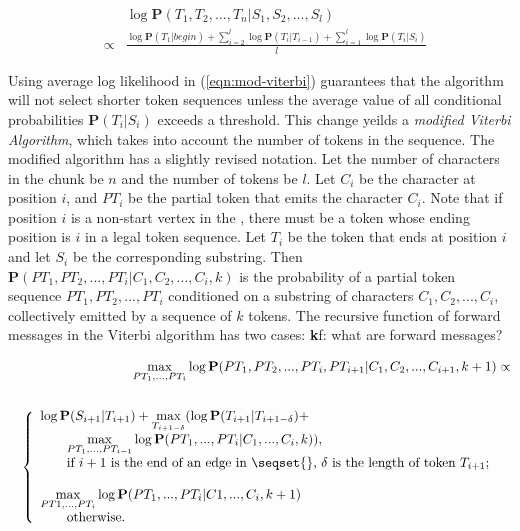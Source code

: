 \begin{eqnarray}
&& \log \mathbf{P}(T_1, T_2, ..., T_n|S_1, S_2, ..., S_l) \nonumber \\ 
& \propto & \frac{\log \mathbf{P}(T_1|begin) +
\sum_{i=2}^{l}\log \mathbf{P}(T_i|T_{i-1}) + 
\sum_{i=1}^{l}\log \mathbf{P}(T_i|S_i)}{l}\label{eqn:mod-viterbi}
\end{eqnarray}

Using average log likelihood in (\ref{eqn:mod-viterbi}) 
guarantees that the algorithm will not select shorter token sequences
unless the average value of all conditional
probabilities $\mathbf{P}(T_i|S_i)$ exceeds a threshold.
This change yeilds a {\em modified Viterbi Algorithm},
which takes into account the number of tokens in the sequence.
The modified algorithm has a slightly revised notation.
Let the number of characters in the chunk be $n$ and the number of tokens be $l$. 
Let $C_i$ be the character at position $i$, and 
$PT_i$ be the partial token that emits the character $C_i$. 
Note that if position $i$ is a non-start vertex in the \seqset{}, 
there must be a token whose ending position is
$i$ in a legal token sequence. Let $T_i$ be the token
that ends at position $i$ and let $S_i$ be the corresponding substring. 
Then
$\mathbf{P}(PT_1, PT_2, ..., PT_i|C_1, C_2, ..., C_i, k)$ is the
probability of a partial token sequence $PT_1, PT_2, ..., PT_i$
conditioned on a substring of characters $C_1, C_2, ..., C_i$,
collectively emitted by a sequence of $k$ tokens.
The recursive function of forward messages in the Viterbi algorithm 
has two cases: {\textbf kf: what are forward messages?}

\begin{eqnarray} 
&&\displaystyle{\max_{PT_1, ..., PT_i}}\log\mathbf{P}(PT_1, PT_2, ..., PT_i,
PT_{i+1}|C_1, C_2, ..., C_{i+1}, k+1) \propto \nonumber \\
&& \nonumber \\
&&\left\{
  \begin{array}{ll}
    \log \mathbf{P}(S_{i+1}|T_{i+1}) + 
    \displaystyle{\max_{T_{i+1-\delta}}}(\log\mathbf{P}(T_{i+1}|T_{i+1-\delta}) + \\
    \qquad \displaystyle{\max_{PT_1, ..., PT_{i-1}}}\log\mathbf{P}(PT_1, ..., PT_i|C_1, ..., C_i, k)), 
& \\ 
  \qquad \hbox{if $i+1$ is the end of an edge in \seqset{},
  $\delta$ is the length of token $T_{i+1}$;} \\\\
    \displaystyle{\max_{PT1, ..., PT_i}}\log\mathbf{P}(PT_1, ..., PT_i|C1, ...,
  C_i, k+1) \\
\qquad \hbox{otherwise.}
  \end{array}
\right. \label{eqn-forward}
\end{eqnarray}

